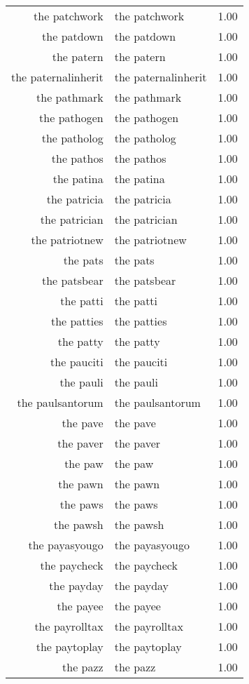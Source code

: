 \begin{table}[ht]
\begin{tabular}{rlr}
  the patchwork & the patchwork & 1.00 \\ 
  the patdown & the patdown & 1.00 \\ 
  the patern & the patern & 1.00 \\ 
  the paternalinherit & the paternalinherit & 1.00 \\ 
  the pathmark & the pathmark & 1.00 \\ 
  the pathogen & the pathogen & 1.00 \\ 
  the patholog & the patholog & 1.00 \\ 
  the pathos & the pathos & 1.00 \\ 
  the patina & the patina & 1.00 \\ 
  the patricia & the patricia & 1.00 \\ 
  the patrician & the patrician & 1.00 \\ 
  the patriotnew & the patriotnew & 1.00 \\ 
  the pats & the pats & 1.00 \\ 
  the patsbear & the patsbear & 1.00 \\ 
  the patti & the patti & 1.00 \\ 
  the patties & the patties & 1.00 \\ 
  the patty & the patty & 1.00 \\ 
  the pauciti & the pauciti & 1.00 \\ 
  the pauli & the pauli & 1.00 \\ 
  the paulsantorum & the paulsantorum & 1.00 \\ 
  the pave & the pave & 1.00 \\ 
  the paver & the paver & 1.00 \\ 
  the paw & the paw & 1.00 \\ 
  the pawn & the pawn & 1.00 \\ 
  the paws & the paws & 1.00 \\ 
  the pawsh & the pawsh & 1.00 \\ 
  the payasyougo & the payasyougo & 1.00 \\ 
  the paycheck & the paycheck & 1.00 \\ 
  the payday & the payday & 1.00 \\ 
  the payee & the payee & 1.00 \\ 
  the payrolltax & the payrolltax & 1.00 \\ 
  the paytoplay & the paytoplay & 1.00 \\ 
  the pazz & the pazz & 1.00 \\ 

\end{tabular}
\end{table}
